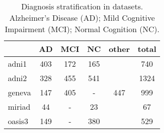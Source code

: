 


\begin{table*}
\centering
\caption{
Diagnosis stratification in datasets.
Alzheimer's Disease (AD);
Mild Cognitive Impairment (MCI);
Normal Cognition (NC).
}
\label{tab:dx_stratification}
\begin{tabular}{lccccc}
\toprule
   &     AD &    MCI &     NC &  other & total \\
\midrule
adni1   &  403 &  172 &  165 &      &  740 \\
adni2   &  328 &  455 &  541 &      & 1324 \\
geneva  &  147 &  405 &    - &  447 &  999 \\
miriad  &   44 &   -  &   23 &      &   67 \\
oasis3  &  149 &    - &  380 &      &  529 \\
\bottomrule
\end{tabular}
\end{table*}


